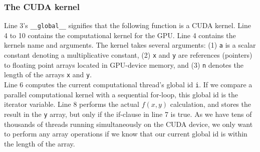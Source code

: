 \subsubsection{The CUDA kernel}
Line 3's \texttt{\_\_global\_\_} signifies that the following function is a CUDA kernel.
Line 4 to 10 contains the computational kernel for the GPU.
Line 4 contains the kernels name and arguments. The kernel takes several arguments:
(1) {\tt a} is a scalar constant denoting a multiplicative constant, 
(2) {\tt x} and {\tt y} are references (pointers) to floating point arrays 
    located in GPU-device memory, and 
(3) {\tt n} denotes the length of the arrays {\tt x} and {\tt y}.\\
Line 6 computes the current computational thread's global id {\tt i}. If we compare
a parallel computational kernel with a sequential for-loop, this global id is
the iterator variable.
Line 8 performs the actual $f(x,y)$ calculation, and stores the result in the {\tt y}
array, but only if the if-clause in line 7 is true. 
As we have tens of thousands of threads running simultaneously on the CUDA
device, we only want to perform any array operations if we know that our current
global id is within the length of the array.
\\\\

